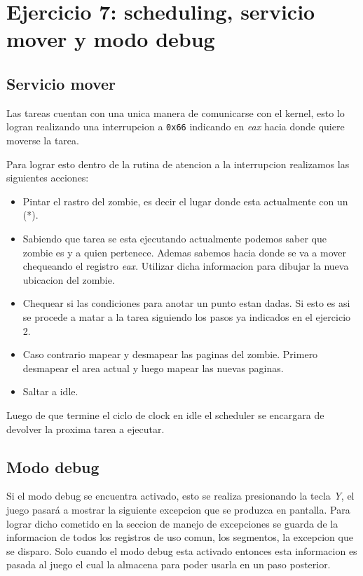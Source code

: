 \section{Ejercicio 7: scheduling, servicio mover y modo debug}


	\subsection{Servicio mover}
	Las tareas cuentan con una unica manera de comunicarse con el kernel, esto lo logran realizando una interrupcion a \texttt{0x66} indicando en \textit{eax} hacia donde quiere moverse la tarea.

	Para lograr esto dentro de la rutina de atencion a la interrupcion realizamos las siguientes acciones:

	\begin{itemize}
		\item{Pintar el rastro del zombie, es decir el lugar donde esta actualmente con un (*).}
		\item{Sabiendo que tarea se esta ejecutando actualmente podemos saber que zombie es y a quien pertenece. Ademas sabemos hacia donde se va a mover chequeando el registro \textit{eax}. Utilizar dicha informacion para dibujar la nueva ubicacion del zombie.}
		\item{Chequear si las condiciones para anotar un punto estan dadas. Si esto es asi se procede a matar a la tarea siguiendo los pasos ya indicados en el ejercicio 2.}
		\item{Caso contrario mapear y desmapear las paginas del zombie. Primero desmapear el area actual y luego mapear las nuevas paginas.}
		\item{Saltar a idle.}
	\end{itemize}

	Luego de que termine el ciclo de clock en idle el scheduler se encargara de devolver la proxima tarea a ejecutar.

	\subsection{Modo debug}
	Si el modo debug se encuentra activado, esto se realiza presionando la tecla \textit{Y}, el juego pasará a mostrar la siguiente excepcion que se produzca en pantalla. Para lograr dicho cometido en la seccion de manejo de excepciones se guarda de la informacion de todos los registros de uso comun, los segmentos, la excepcion que se disparo. Solo cuando el modo debug esta activado entonces esta informacion es pasada al juego el cual la almacena para poder usarla en un paso posterior.

